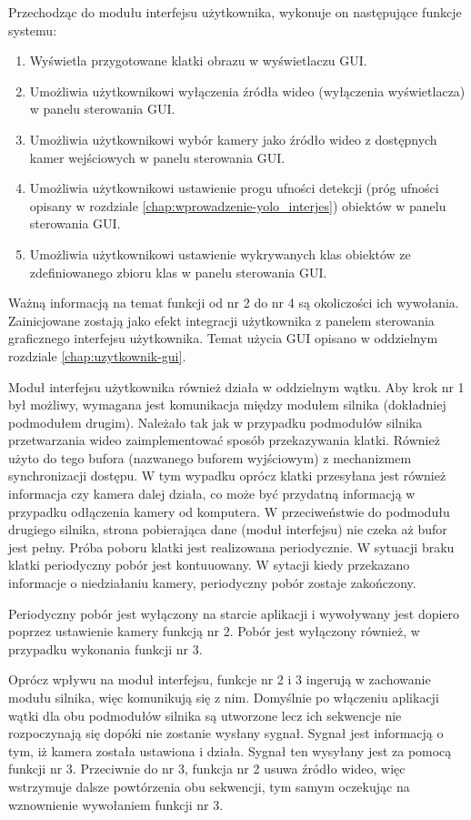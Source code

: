 Przechodząc do modułu interfejsu użytkownika, wykonuje on następujące funkcje systemu:
\begin{enumerate}
    \item Wyświetla przygotowane klatki obrazu w wyświetlaczu GUI.
    \item Umożliwia użytkownikowi wyłączenia źródła wideo (wyłączenia wyświetlacza) w panelu sterowania GUI.
    \item Umożliwia użytkownikowi wybór kamery jako źródło wideo z dostępnych kamer wejściowych w panelu sterowania GUI.
    \item Umożliwia użytkownikowi ustawienie progu ufności detekcji (próg ufności opisany w rozdziale \ref{chap:wprowadzenie-yolo_interjes}) obiektów w panelu sterowania GUI.
    \item Umożliwia użytkownikowi ustawienie wykrywanych klas obiektów ze zdefiniowanego zbioru klas w panelu sterowania GUI.
\end{enumerate}
Ważną informacją na temat funkcji od nr 2 do nr 4 są okoliczości ich wywołania. Zainicjowane zostają jako efekt integracji użytkownika z panelem sterowania graficznego interfejsu użytkownika. Temat użycia GUI opisano w oddzielnym rozdziale \ref{chap:uzytkownik-gui}. 

Moduł interfejsu użytkownika również działa w oddzielnym wątku. Aby krok nr 1 był możliwy, wymagana jest komunikacja między modułem silnika (dokładniej podmodułem drugim).  
Należało tak jak w przypadku podmodułów silnika przetwarzania wideo zaimplementować sposób przekazywania klatki. Również użyto do tego bufora (nazwanego buforem wyjściowym) z mechanizmem synchronizacji dostępu. W tym wypadku oprócz klatki przesyłana jest również informacja czy kamera dalej działa, co może być przydatną informacją w przypadku odłączenia kamery od komputera. W przeciweństwie do podmodułu drugiego silnika, strona pobierająca dane (moduł interfejsu) nie czeka aż bufor jest pełny. Próba poboru klatki jest realizowana periodycznie. W sytuacji braku klatki periodyczny pobór jest kontuuowany. W sytacji kiedy przekazano informacje o niedziałaniu kamery, periodyczny pobór zostaje zakończony.

Periodyczny pobór jest wyłączony na starcie aplikacji i wywoływany jest dopiero poprzez ustawienie kamery funkcją nr 2. Pobór jest wyłączony również, w przypadku wykonania funkcji nr 3.

Oprócz wpływu na moduł interfejsu, funkcje nr 2 i 3 ingerują w zachowanie modułu silnika, więc komunikują się z nim. Domyślnie po włączeniu aplikacji wątki dla obu podmodułów silnika są utworzone lecz ich sekwencje nie rozpoczynają się dopóki nie zostanie wysłany sygnał. Sygnał jest informacją o tym, iż kamera została ustawiona i działa. Sygnał ten wysyłany jest za pomocą funkcji nr 3. Przeciwnie do nr 3, funkcja nr 2 usuwa źródło wideo, więc wstrzymuje dalsze powtórzenia obu sekwencji, tym samym oczekując na wznownienie wywołaniem funkcji nr 3.

